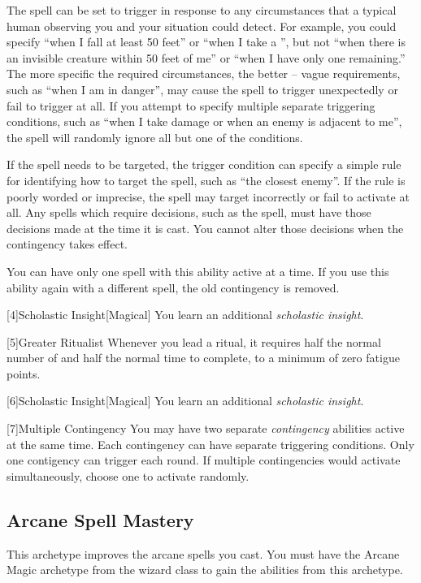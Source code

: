         The spell can be set to trigger in response to any circumstances that a typical human observing you and your situation could detect.
        For example, you could specify ``when I fall at least 50 feet'' or ``when I take a '', but not ``when there is an invisible creature within 50 feet of me'' or ``when I have only one  remaining.''
        The more specific the required circumstances, the better -- vague requirements, such as ``when I am in danger'', may cause the spell to trigger unexpectedly or fail to trigger at all.
        If you attempt to specify multiple separate triggering conditions, such as ``when I take damage or when an enemy is adjacent to me'', the spell will randomly ignore all but one of the conditions.

        If the spell needs to be targeted, the trigger condition can specify a simple rule for identifying how to target the spell, such as ``the closest enemy''.
        If the rule is poorly worded or imprecise, the spell may target incorrectly or fail to activate at all.
        Any spells which require decisions, such as the  spell, must have those decisions made at the time it is cast.
        You cannot alter those decisions when the contingency takes effect.

        You can have only one spell with this ability active at a time.
        If you use this ability again with a different spell, the old contingency is removed.

        [4]{Scholastic Insight}[Magical]
        You learn an additional \textit{scholastic insight}.

        [5]{Greater Ritualist} Whenever you lead a ritual, it requires half the normal number of  and half the normal time to complete, to a minimum of zero fatigue points.

        [6]{Scholastic Insight}[Magical]
        You learn an additional \textit{scholastic insight}.

        [7]{Multiple Contingency} You may have two separate \textit{contingency} abilities active at the same time.
        Each contingency can have separate triggering conditions.
        Only one contigency can trigger each round.
        If multiple contingencies would activate simultaneously, choose one to activate randomly.

    \newpage
    \subsection{Arcane Spell Mastery}
        This archetype improves the arcane spells you cast.
        You must have the Arcane Magic archetype from the wizard class to gain the abilities from this archetype.

